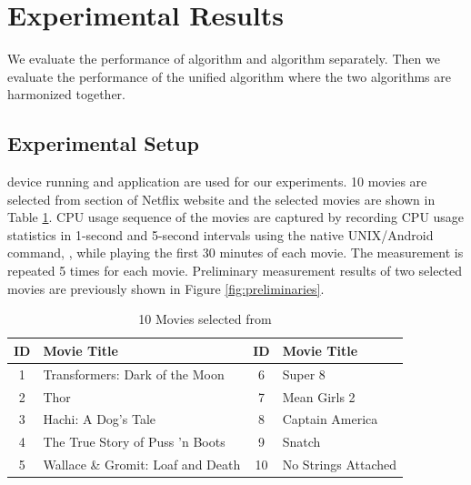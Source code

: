 \section{Experimental Results}
\label{sec:experiments}

We evaluate the performance of  algorithm and  algorithm separately.
Then we evaluate the performance of the unified algorithm where the two algorithms are harmonized together. 

\subsection{Experimental Setup}
\label{sec:experimental_setup}

 device running  and  application are used for our experiments. 
10 movies are selected from  section of Netflix website and the selected movies are shown in Table \ref{tab:movies}.
CPU usage sequence of the movies are captured by recording CPU usage statistics in 1-second and 5-second intervals using the native UNIX/Android command, , while playing the first 30 minutes of each movie. 
The measurement is repeated 5 times for each movie.
Preliminary measurement results of two selected movies are previously shown in Figure \ref{fig:preliminaries}.

\begin{table}[h!]
\begin{center}
\begin{tabular}{|c | m{5cm} ||c| m{5cm}|}
\hline
ID & Movie Title & ID & Movie Title \\ 
\hline
1 & Transformers: Dark of the Moon 		& 6 & Super 8\\
2 & Thor					& 7 & Mean Girls 2 \\
3 & Hachi: A Dog's Tale 			& 8 & Captain America \\
4 & The True Story of Puss 'n Boots 		& 9 &  Snatch \\
5 & Wallace \& Gromit: Loaf and Death 	& 10 & No Strings Attached \\
\hline
\end{tabular}
\end{center}
\caption{10 Movies selected from }
\label{tab:movies}
\end{table}

